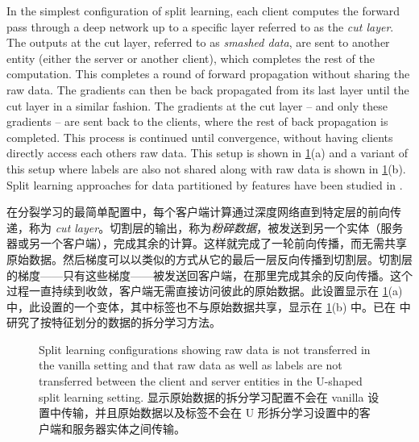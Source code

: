 In the simplest configuration of split learning, each client computes the forward pass through a deep network up to a specific layer referred to as the \emph{cut layer}. The outputs at the cut layer, referred to as \emph{smashed data}, are sent to another entity (either the server or another client), which completes the rest of the computation. This completes a round of forward propagation without sharing the raw data. The gradients can then be back propagated from its last layer until the cut layer in a similar fashion. The gradients at the cut layer -- and only these gradients -- are sent back to the clients, where the rest of back propagation is completed. This process is continued until convergence, without having clients directly access each others raw data. This setup is shown in \cref{splitConfig}(a) and a variant of this setup where labels are also not shared along with raw data is shown in \cref{splitConfig}(b). Split learning approaches for data partitioned by features have been studied in \cite{splitVertical}.

在分裂学习的最简单配置中，每个客户端计算通过深度网络直到特定层的前向传递，称为 \emph {cut layer}。切割层的输出，称为\emph{粉碎数据}，被发送到另一个实体（服务器或另一个客户端），完成其余的计算。这样就完成了一轮前向传播，而无需共享原始数据。然后梯度可以以类似的方式从它的最后一层反向传播到切割层。切割层的梯度——只有这些梯度——被发送回客户端，在那里完成其余的反向传播。这个过程一直持续到收敛，客户端无需直接访问彼此的原始数据。此设置显示在 \cref{splitConfig}(a) 中，此设置的一个变体，其中标签也不与原始数据共享，显示在 \cref{splitConfig}(b) 中。已在 \cite{splitVertical} 中研究了按特征划分的数据的拆分学习方法。
\begin{figure}[!htbp]%
    \centering
    \qquad
    \caption{Split learning configurations showing raw data is not transferred in the vanilla setting and that raw data as well as labels are not transferred between the client and server  entities in the U-shaped split learning setting. 显示原始数据的拆分学习配置不会在 vanilla 设置中传输，并且原始数据以及标签不会在 U 形拆分学习设置中的客户端和服务器实体之间传输。}
\label{splitConfig}
\end{figure}

